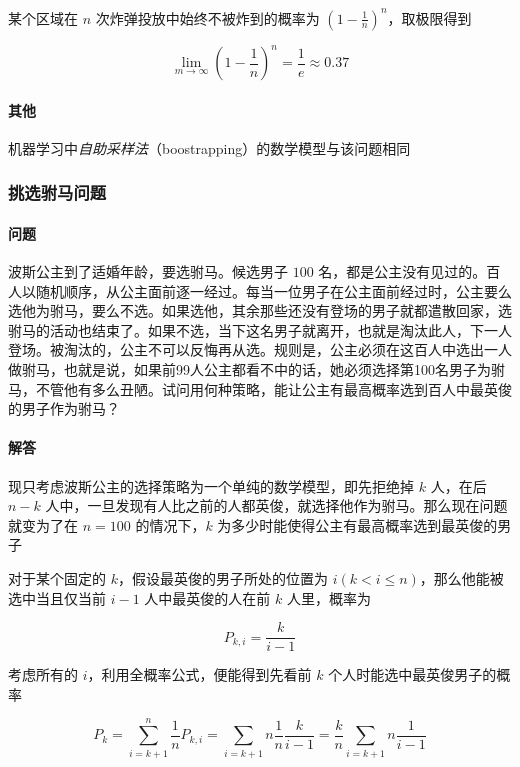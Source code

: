\documentclass[a4paper, 11pt]{article} %
\begin{document}
某个区域在 $n$ 次炸弹投放中始终不被炸到的概率为 $(1-\frac{1}{n})^n$，取极限得到

$$
\lim\limits_{m\to\infty} (1-\frac{1}{n})^n=\frac{1}{e}\approx 0.37
$$

\paragraph{其他}

机器学习中\emph{自助采样法}（boostrapping）的数学模型与该问题相同

\subsubsection{挑选驸马问题}

\paragraph{问题}

波斯公主到了适婚年龄，要选驸马。候选男子 $100$ 名，都是公主没有见过的。百人以随机顺序，从公主面前逐一经过。每当一位男子在公主面前经过时，公主要么选他为驸马，要么不选。如果选他，其余那些还没有登场的男子就都遣散回家，选驸马的活动也结束了。如果不选，当下这名男子就离开，也就是淘汰此人，下一人登场。被淘汰的，公主不可以反悔再从选。规则是，公主必须在这百人中选出一人做驸马，也就是说，如果前99人公主都看不中的话，她必须选择第100名男子为驸马，不管他有多么丑陋。试问用何种策略，能让公主有最高概率选到百人中最英俊的男子作为驸马？

\paragraph{解答}

现只考虑波斯公主的选择策略为一个单纯的数学模型，即先拒绝掉 $k$ 人，在后 $n-k$ 人中，一旦发现有人比之前的人都英俊，就选择他作为驸马。那么现在问题就变为了在 $n=100$ 的情况下，$k$ 为多少时能使得公主有最高概率选到最英俊的男子

对于某个固定的 $k$，假设最英俊的男子所处的位置为 $i(k<i\le n)$，那么他能被选中当且仅当前 $i-1$ 人中最英俊的人在前 $k$ 人里，概率为 

$$
P_{k,i}=\frac{k}{i-1}
$$

考虑所有的 $i$，利用全概率公式，便能得到先看前 $k$ 个人时能选中最英俊男子的概率

$$
P_k=\sum\limits_{i=k+1}^{n}\frac{1}{n}P_{k,i}=\sum\limits_{i=k+1}{n}\frac{1}{n}\frac{k}{i-1}=\frac{k}{n}\sum\limits_{i=k+1}{n}\frac{1}{i-1}
$$
\end{document}
